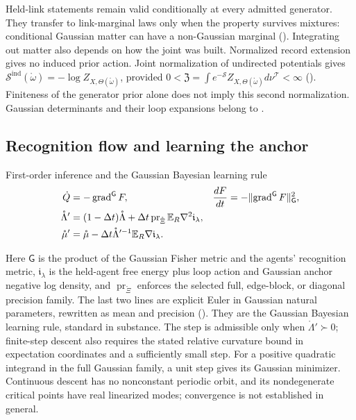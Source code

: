 Held-link statements remain valid conditionally at every admitted generator. They transfer
to link-marginal laws only when the property survives mixtures: conditional Gaussian matter
can have a non-Gaussian marginal (). Integrating out matter
also depends on how the joint was built. Normalized record extension gives no induced prior
action. Joint normalization of undirected potentials gives
$\mathscr S^{\mathrm{ind}}(\mathring\omega)=-\log Z_{X,\Theta(\mathring\omega)}$, provided
$0<\mathfrak Z=\int e^{-\mathscr S}Z_{X,\Theta(\mathring\omega)}d\nu^{\mathscr T}<\infty$
(). Finiteness of the generator prior alone does not imply
this second normalization. Gaussian determinants and their loop expansions belong to
.

\subsection{Recognition flow and learning the anchor}

\begin{keyequation}{First-order inference and the Gaussian Bayesian learning rule}
\[
\begin{aligned}
\dot Q&=-\operatorname{grad}^{\mathsf G}F,
&\frac{dF}{dt}&=-\lVert\operatorname{grad}^{\mathsf G}F\rVert_{\mathsf G}^2,\\
\mathring\Lambda'&=(1-\Delta t)\mathring\Lambda
+\Delta t\operatorname{pr}_{\mathring\Xi}\mathbb E_R\nabla^2\mathfrak i_\lambda,\\
\mathring\mu'&=\mathring\mu-\Delta t\mathring\Lambda'^{-1}\mathbb E_R\nabla\mathfrak i_\lambda.
\end{aligned}
\]
\end{keyequation}

Here $\mathsf G$ is the product of the Gaussian Fisher metric and the agents' recognition
metric, $\mathfrak i_\lambda$ is the held-agent free energy plus loop action and Gaussian
anchor negative log density, and $\operatorname{pr}_{\mathring\Xi}$ enforces the selected
full, edge-block, or diagonal precision family. The last two lines are explicit Euler in
Gaussian natural parameters, rewritten as mean and precision ().
They are the Gaussian Bayesian learning rule, standard in substance. The step is admissible
only when $\mathring\Lambda'\succ0$; finite-step descent also requires the stated relative
curvature bound in expectation coordinates and a sufficiently small step. For a positive
quadratic integrand in the full Gaussian family, a unit step gives its Gaussian minimizer.
Continuous descent has no nonconstant periodic orbit, and its nondegenerate critical points
have real linearized modes; convergence is not established in general.


